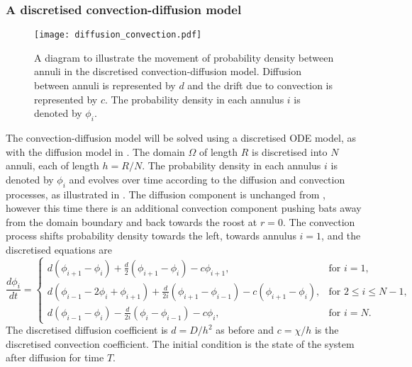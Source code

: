 \subsubsection{A discretised convection-diffusion model}

 \begin{figure} [ht]
     \centering
         \texttt{[image: diffusion\_convection.pdf]}
         \caption{A diagram to illustrate the movement of probability density between annuli in the discretised convection-diffusion model. Diffusion between annuli is represented by $d$ and the drift due to convection is represented by $c$. The probability density in each annulus $i$ is denoted by $\phi_i$.}
     \label{fig:convection_diffusion_diag}
 \end{figure}

The convection-diffusion model will be solved using a discretised ODE model, as with the diffusion model in . The domain $\Omega$ of length $R$ is discretised into $N$ annuli, each of length $h = R/N$. The probability density in each annulus $i$ is denoted by $\phi_i$ and evolves over time according to the diffusion and convection processes, as illustrated in . The diffusion component is unchanged from , however this time there is an additional convection component pushing bats away from the domain boundary and back towards the roost at $r=0$. The convection process shifts probability density towards the left, towards annulus $i = 1$, and the discretised equations are
%
\begin{equation}
\frac{d\phi_i}{dt} = \begin{cases}
		d(\phi_{i+1} - \phi_i) + \frac{d}{2} (\phi_{i+1}-\phi_i) - c \phi_{i+1}, & \text{for } i = 1, \\
		d(\phi_{i-1}-2\phi_i +\phi_{i+1}) + \frac{d}{2i} (\phi_{i+1}-\phi_{i-1}) - c(\phi_{i+1}-\phi_{i}), & \text{for } 2 \leq i \leq N-1, \\
		d(\phi_{i-1}-\phi_i)  - \frac{d}{2i} (\phi_{i}-\phi_{i-1}) - c\phi_{i}, & \text{for } i = N.
		\end{cases}
        \label{eqn:discrete_convection}
\end{equation}
%
The discretised diffusion coefficient is $d = D/h^2$ as before and $c=\chi/h$ is the discretised convection coefficient. The initial condition is the state of the system after diffusion for time $T$.

